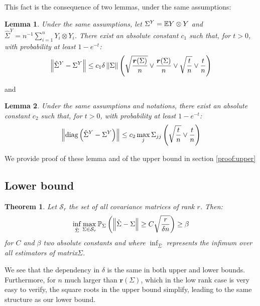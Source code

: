 \documentclass{article}
\numberwithin{equation}{section}
\newtheorem{theorem}{Theorem}
\newtheorem{lemma}{Lemma}
\numberwithin{equation}{section}
\begin{document}
        This fact is the consequence of two lemmas, under the same assumptions:
        \begin{lemma}
        \label{th:upper_Y}
            Under the same assumptions, let $\Sigma^Y = \mathbb{E} Y \otimes Y$ and $\hat{\Sigma}^Y = n^{-1}\sum_{i=1}^n Y_i\otimes Y_i$. There exist an absolute constant $c_1$ such that, for $t>0$, with probability at least $1-e^{-t}$:
            \begin{equation}
                \left\Vert \hat{\Sigma}^Y - \Sigma^Y \right\Vert \leq c_1 \delta\left\Vert \Sigma \right\Vert\left(\sqrt{\frac{\bm{r}(\Sigma)}{n}} \lor \frac{\bm{r}(\Sigma)}{n} \lor \sqrt{\frac{t}{n}} \lor \frac{t}{n}\right)
            \end{equation}
        \end{lemma}
        and
        \begin{lemma}
        Under the same assumptions and notations, there exist an absolute constant $c_2$ such that, for $t>0$, with probability at least $1-e^{-t}$:
        \label{th:upper_Y_diag}
        \begin{equation}
            \left\Vert \text{diag} \left(\hat{\Sigma}^Y - \Sigma^Y\right) \right\Vert \leq c_2 \max_j \Sigma_{jj} \left(\sqrt{\frac{t}{n}}\lor\frac{t}{n} \right)
        \end{equation}
        \end{lemma}
        We provide proof of these lemma and of the upper bound in section \ref{proof:upper}

    \subsection{Lower bound}
    \label{sec:lower_bound}

        \begin{theorem}
        \label{th:lower}
        Let $\mathcal{S}_r$ the set of all covariance matrices of rank $r$. Then:
        \begin{equation}
            \inf_{\hat{\Sigma}} \max_{\Sigma\in \mathcal{S}_r} \mathbb{P}_\Sigma \left(\left\Vert \hat{\Sigma} - \Sigma \right\Vert \geq C \sqrt{\frac{r}{\delta n}} \right) \geq \beta
        \end{equation}
        for $C$ and $\beta$ two absolute constants and where $\inf_{\hat{\Sigma}}$ represents the infimum over all estimators of matrix$\Sigma$.
        \end{theorem}

        We see that the dependency in $\delta$ is the same in both upper and lower bounds. Furthermore, for $n$ much larger than $\bm{r}(\Sigma)$, which in the low rank case is very easy to verify, the square roots in the upper bound simplify, leading to the same structure as our lower bound. 
\end{document}
